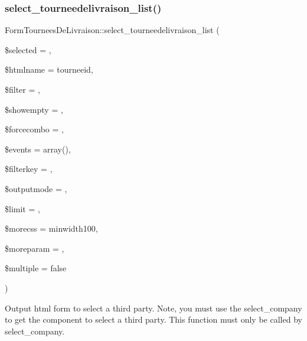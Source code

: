 \subsubsection{\texorpdfstring{select\+\_\+tourneedelivraison\+\_\+list()}{select\_tourneedelivraison\_list()}}
{\footnotesize\ttfamily Form\+Tournees\+De\+Livraison\+::select\+\_\+tourneedelivraison\+\_\+list (\begin{DoxyParamCaption}\item[{}]{\$selected = {\ttfamily \textquotesingle{}\textquotesingle{}},  }\item[{}]{\$htmlname = {\ttfamily \textquotesingle{}tourneeid\textquotesingle{}},  }\item[{}]{\$filter = {\ttfamily \textquotesingle{}\textquotesingle{}},  }\item[{}]{\$showempty = {\ttfamily \textquotesingle{}\textquotesingle{}},  }\item[{}]{\$forcecombo = {},  }\item[{}]{\$events = {\ttfamily array()},  }\item[{}]{\$filterkey = {\ttfamily \textquotesingle{}\textquotesingle{}},  }\item[{}]{\$outputmode = {},  }\item[{}]{\$limit = {},  }\item[{}]{\$morecss = {\ttfamily \textquotesingle{}minwidth100\textquotesingle{}},  }\item[{}]{\$moreparam = {\ttfamily \textquotesingle{}\textquotesingle{}},  }\item[{}]{\$multiple = {\ttfamily false} }\end{DoxyParamCaption})}

Output html form to select a third party. Note, you must use the select\+\_\+company to get the component to select a third party. This function must only be called by select\+\_\+company.


